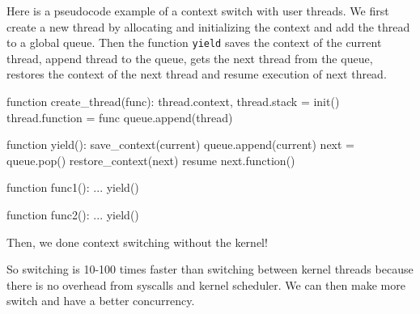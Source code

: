     \begin{tcolorbox}[rouge]
        Here is a pseudocode example of a context switch with  user threads. We first create a new thread by allocating and initializing the context and add the thread to a global queue. Then the function \texttt{yield} saves the context of the current thread, append thread to the queue, gets the next thread from the queue, restores the context of the next thread and resume execution of next thread.
    
    \begin{codeCenter}
    \begin{Ccode}
function create_thread(func):
    thread.context, thread.stack = init()
    thread.function = func
    queue.append(thread)

function yield():
    save_context(current)
    queue.append(current)
    next = queue.pop()
    restore_context(next)
    resume next.function()

function func1():
    ...
    yield()

function func2():
    ...
    yield()
    \end{Ccode}
    \end{codeCenter}
    Then, we done context switching without the kernel!
    \end{tcolorbox}
        So switching is 10-100 times faster than switching between kernel threads because there is no overhead from syscalls and kernel scheduler. We can then make more switch and have a better concurrency.
